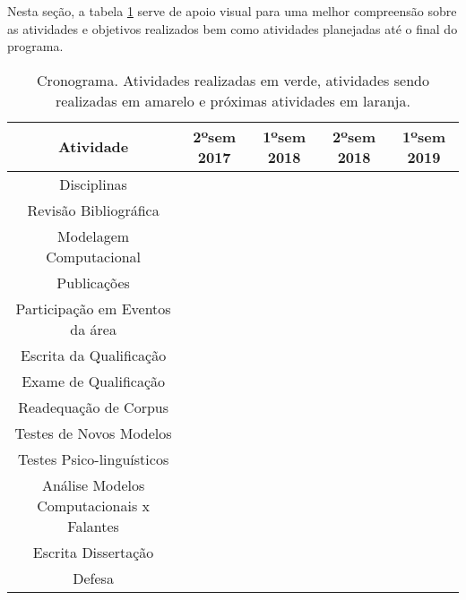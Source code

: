 Nesta seção, a tabela \ref{tab:schedule} serve de apoio visual para uma melhor compreensão sobre as atividades e objetivos realizados bem como atividades planejadas até o final do programa.

\begin{table}[ht!]
  \center
  \begin{tabular}{|c|c|c|c|c|}\hline
    {Atividade} & 2ºsem 2017 & 1ºsem 2018 & 2ºsem 2018 & 1ºsem 2019 \\ \hline \hline
    Disciplinas & \cellcolor{green!45} &\cellcolor{green!45} &  & \\ \hline
    Revisão Bibliográfica & \cellcolor{green!45} & \cellcolor{green!45} & \cellcolor{yellow!45} & \\ \hline 
    Modelagem Computacional & \cellcolor{green!45} & \cellcolor{green!45} & \cellcolor{yellow!45}& \\ \hline
    Publicações & & & \cellcolor{green!45} & \\ \hline
   Participação em Eventos da área &\cellcolor{green!45} & \cellcolor{green!45} & \cellcolor{yellow!45} & \cellcolor{orange!45}\\ \hline
    Escrita da Qualificação & &\cellcolor{green!45} &\cellcolor{green!45} &  \\ \hline
    Exame de Qualificação & & &\cellcolor{yellow!45} & \\ \hline
    Readequação de Corpus & & &\cellcolor{orange!45} &  \\ \hline
    Testes de Novos Modelos & & &\cellcolor{orange!45} &\\ \hline
    Testes Psico-linguísticos & & & &\cellcolor{orange!45} \\ \hline
    Análise Modelos Computacionais x Falantes & & & &\cellcolor{orange!45} \\ \hline
    Escrita Dissertação & & &\cellcolor{yellow!45} &\cellcolor{orange!45}\\ \hline
    Defesa & & & &\cellcolor{orange!45} \\ \hline
  \end{tabular}
  \caption{Cronograma. Atividades realizadas em verde, atividades sendo realizadas em amarelo e próximas atividades em laranja.}
  \label{tab:schedule}
\end{table}